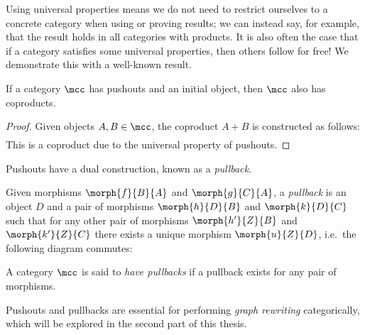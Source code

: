 Using universal properties means we do not need to restrict ourselves to a
concrete category when using or proving results; we can instead say, for
example, that the result holds in all categories with products.
It is also often the case that if a category satisfies some universal
properties, then others follow for free!
We demonstrate this with a well-known result.

\begin{lemma}
    \label{lem:coproducts-pushout}
    If a category \(\mcc\) has pushouts and an initial object, then \(\mcc\)
    also has coproducts.
\end{lemma}
\begin{proof}
    Given objects \(A,B \in \mcc\), the coproduct \(A + B\) is constructed as
    follows:
    \begin{gather*}
    \end{gather*}
    This is a coproduct due to the universal property of pushouts.
\end{proof}

Pushouts have a dual construction, known as a \emph{pullback}.

\begin{definition}[Pullback]
    Given morphisms \(\morph{f}{B}{A}\) and \(\morph{g}{C}{A}\), a
    \emph{pullback} is an object \(D\) and a pair of morphisms
    \(\morph{h}{D}{B}\) and \(\morph{k}{D}{C}\) such that for any other pair of
    morphisms \(\morph{h^\prime}{Z}{B}\) and \(\morph{k^\prime}{Z}{C}\) there
    exists a unique morphism \(\morph{u}{Z}{D}\), i.e.\ the following diagram
    commutes:
    \begin{center}
        
    \end{center}
    A category \(\mcc\) is said to \emph{have pullbacks} if a pullback exists
    for any pair of morphisms.
\end{definition}

Pushouts and pullbacks are essential for performing \emph{graph rewriting}
categorically, which will be explored in the second part of this thesis.
